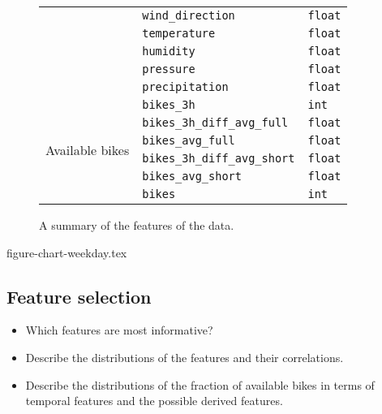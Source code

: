 \documentclass[11pt]{extarticle}
\begin{document}
\begin{figure}
\begin{tabular}{lll}
                                           & \texttt{wind\_direction}             & \texttt{float}
    \\
                                           & \texttt{temperature}
                                           & \texttt{float}
    \\
                                           & \texttt{humidity}                    & \texttt{float}
    \\
                                           & \texttt{pressure}                    &
    \texttt{float}
    \\
                                           & \texttt{precipitation}               & \texttt{float}
    \\
    \hline
    \multirow{6}{*}{Available bikes}       & \texttt{bikes\_3h}                   & \texttt{int}
    \\
                                           &
    \texttt{bikes\_3h\_diff\_avg\_full}    & \texttt{float}
    \\
                                           & \texttt{bikes\_avg\_full}            &
    \texttt{float}
    \\
                                           & \texttt{bikes\_3h\_diff\_avg\_short} & \texttt{float}
    \\
                                           &
    \texttt{bikes\_avg\_short}             & \texttt{float}
    \\
                                           & \texttt{bikes}                       & \texttt{int}
  \end{tabular}
  \caption{A summary of the features of the data.
  }
  \label{table:features}
\end{figure}

{figure-chart-weekday.tex}

\subsection{Feature selection}

\begin{itemize}
  \item Which features are most informative?
  \item Describe the distributions of the features and their correlations.
  \item Describe the distributions of the fraction of available bikes in terms of
        temporal features and the possible derived features.
\end{itemize}
\end{document}
